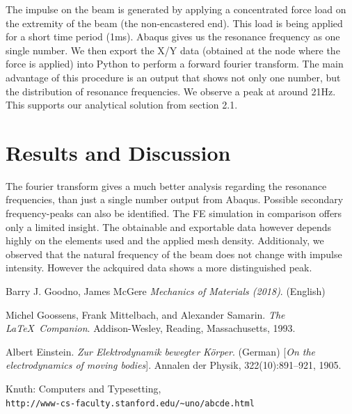 \documentclass[12pt]{article}
\begin{document}
\noindent The impulse on the beam is generated by applying a concentrated force load on the extremity of the beam (the non-encastered end).
This load is being applied for a short time period (1ms). Abaqus gives us the resonance frequency as one single number. 
We then export the X/Y data (obtained at the node where the force is applied) 
into Python to perform a forward fourier transform.
The main advantage of this procedure is an output that shows not only one number, 
but the distribution of resonance frequencies. We observe a peak at around 21Hz. This supports our analytical solution from
section 2.1.


\section{Results and Discussion}

The fourier transform gives a much better analysis regarding the resonance frequencies,
than just a single number output from Abaqus. 
Possible secondary frequency-peaks can also be identified. The FE simulation in comparison offers 
only a limited insight. The obtainable and exportable data however depends highly on the
elements used and the applied mesh density.
Additionaly, we observed that the natural frequency of the beam does not change with impulse intensity\cite{natural frequencies}.
However the ackquired data shows a more distinguished peak. 


\pagebreak
\begin{thebibliography}{9}

  
  Barry J. Goodno, James McGere
  \textit{Mechanics of Materials (2018)}. (English)  

  Michel Goossens, Frank Mittelbach, and Alexander Samarin. 
  \textit{The \LaTeX\ Companion}. 
  Addison-Wesley, Reading, Massachusetts, 1993.
   
  Albert Einstein. 
  \textit{Zur Elektrodynamik bewegter K{\"o}rper}. (German) 
  [\textit{On the electrodynamics of moving bodies}]. 
  Annalen der Physik, 322(10):891–921, 1905.
   
  Knuth: Computers and Typesetting,
  \\\texttt{http://www-cs-faculty.stanford.edu/\~{}uno/abcde.html}
\end{thebibliography}
\end{document}
